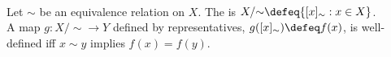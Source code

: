 \begin{definition} \label{def:quotient-set-by-equivalence-relation} \\
Let $\sim$ be an equivalence relation on $X$. The  is $X/{\sim}\defeq\{[x]_{\sim}:x\in X\}$.\\
A map $g:X/{\sim}\to Y$ defined by representatives, $g([x]_{\sim})\defeq f(x)$, is well-defined iff $x\sim y$ implies $f(x)=f(y)$.
\end{definition}
